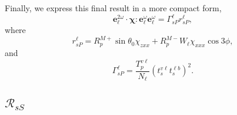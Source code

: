 \documentclass{article}
\begin{document}
Finally, we express this final result in a more compact form,
\begin{equation}
\mathbf{e}^{2\omega}_{\ell}\cdot\boldsymbol{\chi}:
\mathbf{e}^{\omega}_{\ell}\mathbf{e}^{\omega}_{\ell} =
\Gamma^{\ell}_{sP}r^{\ell}_{sP},
\end{equation}
where
\begin{equation}
r^{\ell}_{sP} = 
R^{M+}_{p}\sin\theta_{0}\chi_{zxx} + R^{M-}_{p}W_{\ell}\chi_{xxx}\cos3\phi,
\end{equation}
and
\begin{equation}
\Gamma^{\ell}_{sP} = 
\frac{T^{v\ell}_{p}}{N_{\ell}}
\left(t^{v\ell}_{s}t^{\ell b}_{s}\right)^{2}.
\end{equation}


\subsection{\texorpdfstring{$\mathcal{R}_{sS}$}{RsS}}\label{sec:RsS}
\end{document}

